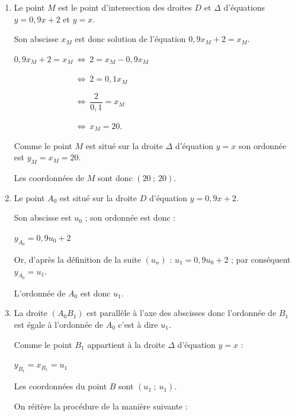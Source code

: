 \begin{corrige}
     \par
     \begin{enumerate}
          \item %
          Le point $M$ est le point d'intersection des droites $D$ et $\Delta$ d'équations $y=0,9x+2$ et $y=x$.
          \par
          Son abscisse $x_M$ est donc solution de l'équation $0,9x_M+2 = x_M$.
          \par
          $0,9x_M+2 = x_M\ \Leftrightarrow \ 2=x_M-0,9x_M$
          \par
          $\phantom{0,9x_M+2 = x_M}\ \Leftrightarrow \ 2=0,1x_M$
          \par
          $\phantom{0,9x_M+2 = x_M}\ \Leftrightarrow \ \dfrac{2}{0,1}=x_M$
          \par
          $\phantom{0,9x_M+2 = x_M}\ \Leftrightarrow \ x_M=20$.
          \par
          Comme le point $M$ est situé sur la droite $\Delta$ d'équation $y=x$ son ordonnée est $y_M=x_M=20$.
          \par
          Les coordonnées de $M$ sont donc $(20~;~20)$.
          \item %
          Le point $A_0$ est situé sur la droite $D$ d'équation $y=0,9x+2$.
          \par
          Son abscisse est $u_0$ ; son ordonnée est donc :
          \par
          $y_{A_0}=0,9u_0+2$
          \par
          Or, d'après la définition de la suite $(u_n)$ : $u_1=0,9u_0+2$ ; par conséquent $y_{A_0}=u_1$.
          \par
          L'ordonnée de $A_0$ est donc $u_1$.
          \item %
          La droite $(A_0B_1)$ est parallèle à l'axe des abscisses donc l'ordonnée de $B_1$ est égale à l'ordonnée de $A_0$ c'est à dire $u_1$.
          \par
          Comme le point $B_1$ appartient à la droite $\Delta$ d'équation $y=x$ :
          \par
          $y_{B_1}=x_{B_1}=u_1$
          \par
          Les coordonnées du point $B$ sont $(u_1~;~u_1)$.
          \par
          On réitère la procédure de la manière suivante :
          \par
          \begin{itemize}

\end{itemize}
\end{enumerate}
\end{corrige}
